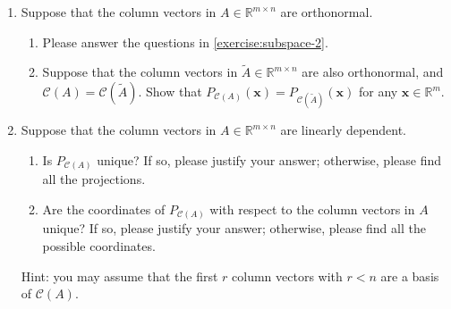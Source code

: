 \documentclass[11pt,letter,notitlepage]{article}
\begin{document}
\begin{exercise}
\begin{enumerate}
        \item Suppose that the column vectors in $A\in\mathbb{R}^{m\times n}$ are orthonormal.
              \begin{enumerate}
                  \item Please answer the questions in \ref{exercise:subspace-2}.

                  \item Suppose that the column vectors in $\widetilde{A}\in\mathbb{R}^{m\times n}$ are also orthonormal, and $\mathcal{C}(A)=\mathcal{C}(\widetilde{A})$. Show that $P_{\mathcal{C}(A)}(\mathbf{x})=P_{\mathcal{C}(\widetilde{A})}(\mathbf{x})$ for any $\mathbf{x}\in\mathbb{R}^m$.
              \end{enumerate}

        \item Suppose that the column vectors in $A\in\mathbb{R}^{m\times n}$ are linearly dependent.
              \begin{enumerate}
                  \item Is $P_{\mathcal{C}(A)}$ unique? If so, please justify your answer; otherwise, please find all the projections.

                  \item Are the coordinates of $P_{\mathcal{C}(A)}$ with respect to the column vectors in $A$ unique? If so, please justify your answer; otherwise, please find all the possible coordinates.
              \end{enumerate}
              Hint: you may assume that the first $r$ column vectors with $r<n$ are a basis of $\mathcal{C}(A)$.
    \end{enumerate}
\end{exercise}
\end{document}

